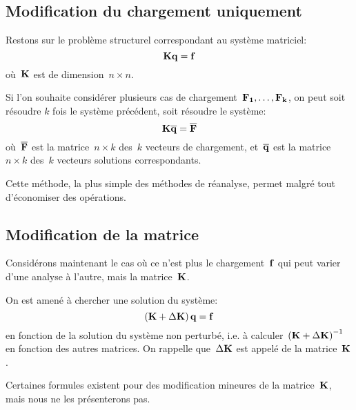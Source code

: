 \medskip
\subsection{Modification du chargement uniquement}
Restons sur le problème structurel correspondant au système matriciel:
\begin{equation}
\MM{K} \VV{q} = \VV{f}
\end{equation}
où~$\MM{K}$ est de dimension~$n\times n$.%

\medskip
Si l'on souhaite considérer plusieurs cas de chargement~$\VV{F_1},\ldots,\VV{F_k}$, on peut soit résoudre
$k$ fois le système précédent, soit résoudre le système:
\begin{equation}
\MM{K} \MM{\overline{q}} =\MM{\overline{F}}
\end{equation}
où~$\MM{\overline{F}}$ est la matrice~$n\times k$ des~$k$ vecteurs de chargement, et~$\MM{\overline{q}}$ est la
matrice~$n\times k$ des~$k$ vecteurs solutions correspondants.

\medskip
Cette méthode, la plus simple des méthodes de réanalyse, permet malgré tout
d'économiser des opérations.


\medskip
\subsection{Modification de la matrice}
Considérons maintenant le cas où ce n'est plus le chargement~$\VV{f}$ qui peut varier d'une analyse
à l'autre, mais la matrice~$\MM{K}$.

On est amené à chercher une solution du système:
\begin{equation}
\left(\MM{K}+\Delta\MM{ K}\right)\VV{q}=\VV{f}
\end{equation}
en fonction de la solution du système non perturbé, i.e. à calculer~$\left(\MM{K}+\Delta\MM{K}\right)^{-1}$
en fonction des autres matrices. On rappelle que~$\Delta\MM{ K}$ est appelé 
 de la matrice~$\MM{K}$.

Certaines formules existent pour des modification mineures de la matrice~$\MM{K}$, mais nous ne les
présenterons pas.

\medskip
